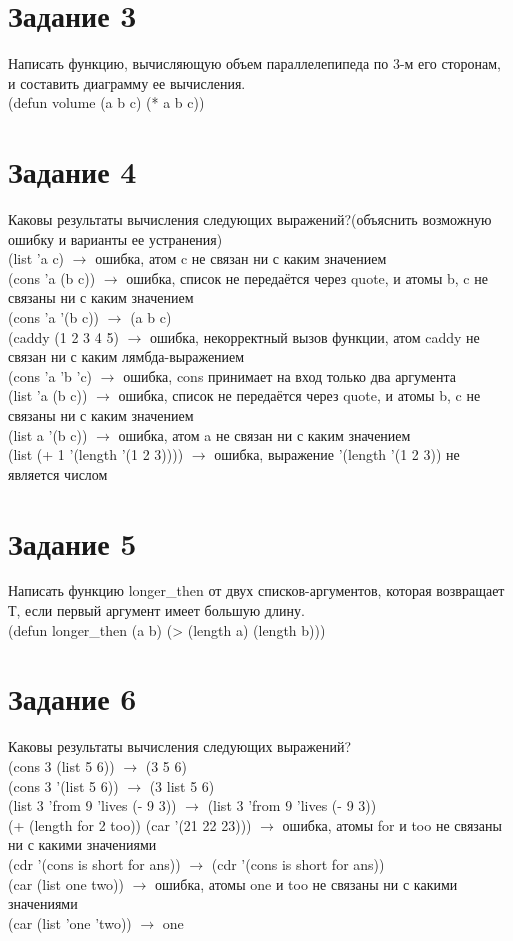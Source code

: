 \section{Задание 3}
Написать функцию, вычисляющую объем параллелепипеда по 3-м его сторонам, и
составить диаграмму ее вычисления.\\
(defun volume (a b c) (* a b c))
\newpage
\section{Задание 4}
Каковы результаты вычисления следующих выражений?(объяснить возможную ошибку и
варианты ее устранения)\\

(list 'a c) $\rightarrow$ ошибка, атом c не связан ни с каким значением\\
(cons 'a (b c)) $\rightarrow$ ошибка, список не передаётся через quote, и атомы b, c не связаны ни с каким значением\\
(cons 'a '(b c)) $\rightarrow$ (a b c)\\
(caddy (1 2 3 4 5) $\rightarrow$ ошибка, некорректный вызов функции, атом caddy не связан ни с каким лямбда-выражением\\
(cons 'a  'b 'c) $\rightarrow$ ошибка, cons принимает на вход только два аргумента\\
(list 'a (b c)) $\rightarrow$  ошибка, список не передаётся через quote, и атомы b, c не связаны ни с каким значением\\
(list a '(b c)) $\rightarrow$ ошибка, атом a не связан ни с каким значением\\
(list (+  1 '(length '(1 2 3)))) $\rightarrow$ ошибка, выражение '(length '(1 2 3)) не является числом\\
\section{Задание 5}
Написать функцию longer\_then от двух списков-аргументов, которая возвращает Т, если
первый аргумент имеет большую длину.\\

(defun longer\_then (a b) (> (length a) (length b)))
\section{Задание 6}
Каковы результаты вычисления следующих выражений?\\

(cons 3 (list 5 6)) $\rightarrow$ (3 5 6)\\
(cons 3 '(list 5 6)) $\rightarrow$ (3 list 5 6)\\
(list 3 'from 9 'lives (- 9 3)) $\rightarrow$ (list 3 'from 9 'lives (- 9 3))\\
(+ (length for 2 too)) (car '(21 22 23))) $\rightarrow$ ошибка, атомы for и too не связаны ни с какими значениями\\
(cdr '(cons is short for ans)) $\rightarrow$ (cdr '(cons is short for ans))\\
(car (list one two)) $\rightarrow$ ошибка, атомы one и too не связаны ни с какими значениями\\
(car (list 'one 'two)) $\rightarrow$ one\\
